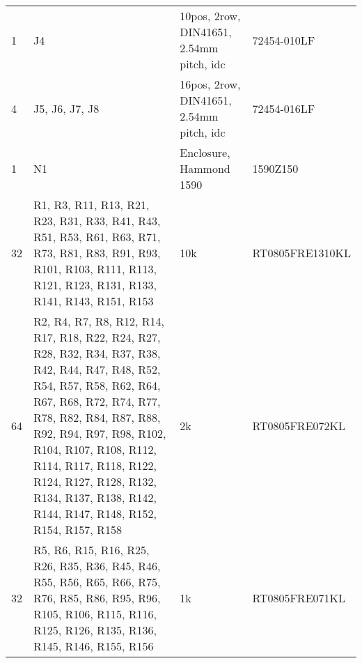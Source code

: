 \begin{longtable}[c]{@{} lp{5cm}p{5cm}l @{}}
    1   & J4                                                                                                                                                                                                                                                                                                                                                                       & 10pos, 2row, DIN41651, 2.54mm pitch, idc            & 72454-010LF     \\
    4   & J5, J6, J7, J8                                                                                                                                                                                                                                                                                                                                                           & 16pos, 2row, DIN41651, 2.54mm pitch, idc            & 72454-016LF     \\
    1   & N1                                                                                                                                                                                                                                                                                                                                                                       & Enclosure, Hammond 1590                             & 1590Z150        \\
    32  & R1, R3, R11, R13, R21, R23, R31, R33, R41, R43, R51, R53, R61, R63, R71, R73, R81, R83, R91, R93, R101, R103, R111, R113, R121, R123, R131, R133, R141, R143, R151, R153                                                                                                                                                                                                 & 10k                                                 & RT0805FRE1310KL \\
    64  & R2, R4, R7, R8, R12, R14, R17, R18, R22, R24, R27, R28, R32, R34, R37, R38, R42, R44, R47, R48, R52, R54, R57, R58, R62, R64, R67, R68, R72, R74, R77, R78, R82, R84, R87, R88, R92, R94, R97, R98, R102, R104, R107, R108, R112, R114, R117, R118, R122, R124, R127, R128, R132, R134, R137, R138, R142, R144, R147, R148, R152, R154, R157, R158                       & 2k                                                  & RT0805FRE072KL  \\
    32  & R5, R6, R15, R16, R25, R26, R35, R36, R45, R46, R55, R56, R65, R66, R75, R76, R85, R86, R95, R96, R105, R106, R115, R116, R125, R126, R135, R136, R145, R146, R155, R156                                                                                                                                                                                                 & 1k                                                  & RT0805FRE071KL  \\

\end{longtable}
